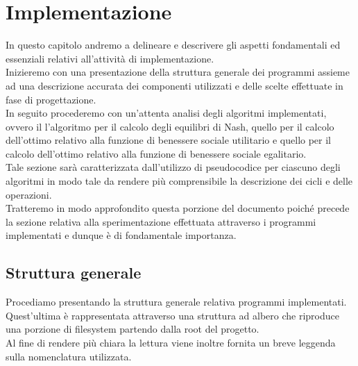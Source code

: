 \chapter{Implementazione}

In questo capitolo andremo a delineare e descrivere gli aspetti fondamentali ed essenziali relativi all'attività di implementazione.\\

Inizieremo con una presentazione della struttura generale dei programmi assieme ad una descrizione accurata dei componenti utilizzati e delle scelte effettuate in fase di progettazione.\\

In seguito procederemo con un'attenta analisi degli algoritmi implementati, ovvero il l'algoritmo per il calcolo degli equilibri di Nash, quello per il calcolo dell'ottimo relativo alla funzione di benessere sociale utilitario e quello per il calcolo dell'ottimo relativo alla funzione di benessere sociale egalitario.\\
Tale sezione sarà caratterizzata dall'utilizzo di pseudocodice per ciascuno degli algoritmi in modo tale da rendere più comprensibile la descrizione dei cicli e delle operazioni.\\

Tratteremo in modo approfondito questa porzione del documento poiché precede la sezione relativa alla sperimentazione effettuata attraverso i programmi implementati e dunque è di fondamentale importanza.\\

\section{Struttura generale}
\justify

Procediamo presentando la struttura generale relativa programmi implementati.\\ 
Quest'ultima è rappresentata attraverso una struttura ad albero che riproduce una porzione di filesystem partendo dalla root del progetto.\\
Al fine di rendere più chiara la lettura viene inoltre fornita un breve leggenda sulla nomenclatura utilizzata.\\

